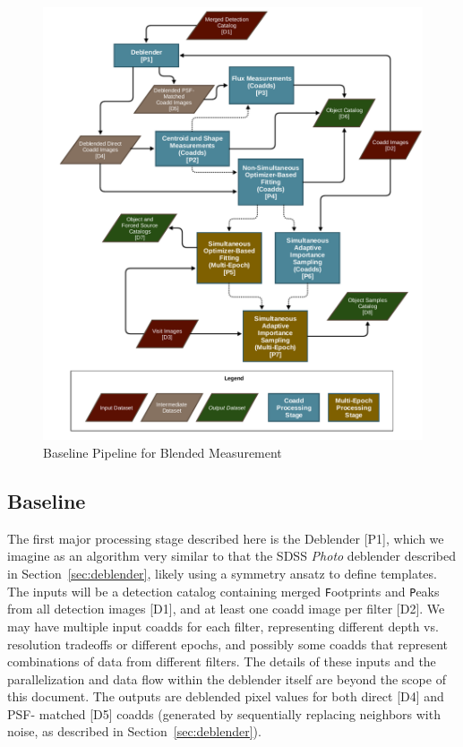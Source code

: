 \documentclass[10pt]{article}
\begin{document}
\begin{figure}
\includegraphics[width=\columnwidth]{flowchart}
\caption{Baseline Pipeline for Blended Measurement}
\label{fig:flowchart}
\end{figure}

\subsection{Baseline}

The first major processing stage described here is the Deblender [P1], which
we imagine as an algorithm very similar to that the SDSS {\em Photo} deblender
described in Section~\ref{sec:deblender}, likely using a symmetry ansatz to
define templates.  The inputs will be a detection catalog containing merged
{\texttt Footprints} and {\texttt Peaks} from all detection images [D1], and
at least one coadd image per filter [D2].  We may have multiple input coadds
for each filter, representing different depth vs. resolution tradeoffs or
different epochs, and possibly some coadds that represent combinations of data
from different filters. The details of these inputs and the parallelization
and data flow within the deblender itself are beyond the scope of this
document. The outputs are deblended pixel values for both direct [D4] and PSF-
matched [D5] coadds (generated by sequentially replacing neighbors with noise,
as described in Section~\ref{sec:deblender}).
\end{document}

